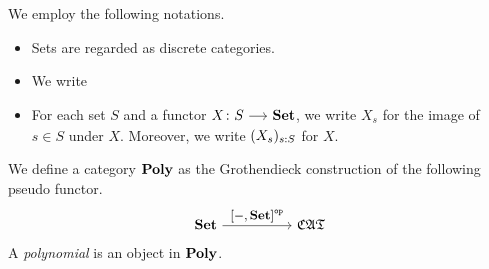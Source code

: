 \documentclass[a4paper,dvipsnames, 11pt]{amsart}
\begin{document}
\maketitle
\begin{notation}
	We employ the following notations.
	\begin{itemize}
		\item %
			Sets are regarded as discrete categories.
		\item %
			We write
		\item %
			For each set $S$ and a functor $X\colon S\arr\Set$,
			we write $X_s$ for the image of $s\in S$ under $X$.
			Moreover, we write $(X_s)_{s: S}$ for $X$.
	\end{itemize}
\end{notation}
\begin{definition}
	We define a category $\mathbf{Poly}$ as the Grothendieck construction of the following pseudo functor.
	\[
		\Set
		\arr"\left[-,\Set\right]^\op"[][5]
		\CATbi
	\]
	A \emph{polynomial} is an object in $\mathbf{Poly}$.
\end{definition}



\end{document}
